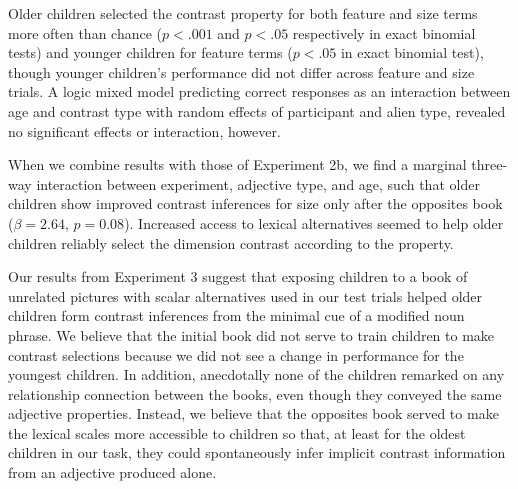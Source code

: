 \documentclass[10pt,letterpaper]{article}
\begin{document}
Older children selected the contrast property for both feature and size terms more often than chance ($p < .001$ and $p < .05$ respectively in exact binomial tests) and younger children for feature terms ($p < .05$ in exact binomial test), though younger children's performance did not differ across feature and size trials.  A logic mixed model predicting correct responses as an interaction between age and contrast type with random effects of participant and alien type, revealed no significant effects or interaction, however.

When we combine results with those of Experiment 2b, we find a marginal three-way interaction between experiment, adjective type, and age, such that older children show improved contrast inferences for size only after the opposites book ($\beta = 2.64$, $p =0.08$).  Increased access to lexical alternatives seemed to help older children reliably select the dimension contrast according to the property.  

Our results from Experiment 3 suggest that exposing children to a book of unrelated pictures with scalar alternatives used in our test trials helped older children form contrast inferences from the minimal cue of a modified noun phrase.  We believe that the initial book did not serve to train children to make contrast selections because we did not see a change in performance for the youngest children.  In addition, anecdotally none of the children remarked on any relationship connection between the books, even though they conveyed the same adjective properties.  Instead, we believe that the opposites book served to make the lexical scales more accessible to children so that, at least for the oldest children in our task, they could spontaneously infer implicit contrast information from an adjective produced alone.   

\end{document}
